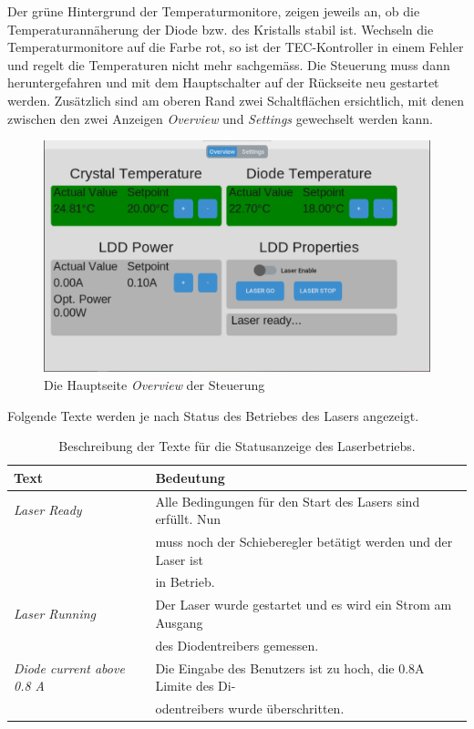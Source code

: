Der grüne Hintergrund der Temperaturmonitore, zeigen jeweils an, ob die Temperaturannäherung der Diode bzw. des Kristalls stabil ist. Wechseln die Temperaturmonitore auf die Farbe rot, so ist der TEC-Kontroller in einem Fehler und regelt die Temperaturen nicht mehr sachgemäss. Die Steuerung muss dann heruntergefahren und mit dem Hauptschalter auf der Rückseite neu gestartet werden.
Zusätzlich sind am oberen Rand zwei Schaltflächen ersichtlich, mit denen zwischen den zwei Anzeigen \textit{Overview} und \textit{Settings} gewechselt werden kann.

\begin{figure}[H]
    \centering
    \includegraphics[scale=0.3, trim={1mm 1mm 1mm 1mm}, clip]{98_images/overview_window_large_02.PNG}
    \caption{Die Hauptseite \textit{Overview} der Steuerung}
    \label{fig:overview_sw}
\end{figure}

Folgende Texte werden je nach Status des Betriebes des Lasers angezeigt.

\begin{table}[H]
    \centering
    \begin{tabular}{l|l}
        \textbf{Text}&                          \textbf{Bedeutung}\\
        \hline
         \textit{Laser Ready}&                  Alle Bedingungen für den Start des Lasers sind erfüllt. Nun\\
         &                                      muss noch der Schieberegler betätigt werden und der Laser ist\\
         &                                      in Betrieb.\\
         \textit{Laser Running}&                Der Laser wurde gestartet und es wird ein Strom am Ausgang\\
         &                                      des Diodentreibers gemessen.\\
         \textit{Diode current above 0.8 A}&    Die Eingabe des Benutzers ist zu hoch, die 0.8A Limite des Di-\\
         &                                      odentreibers wurde überschritten.                                
    \end{tabular}
    \caption{Beschreibung der Texte für die Statusanzeige des Laserbetriebs.}
    \label{tab:my_label}
\end{table}

